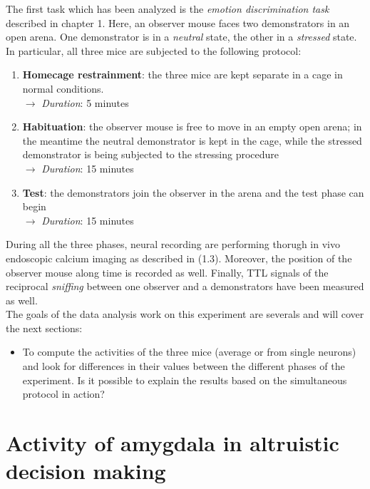 \documentclass[a4paper]{article}
\begin{document}
The first task which has been analyzed is the \textit{emotion discrimination task} described in chapter 1. Here, an observer mouse faces two demonstrators in an open arena. One demonstrator is in a \textit{neutral} state, the other in a \textit{stressed} state. In particular, all three mice are subjected to the following protocol:

\begin{enumerate}
	
	\item \textbf{Homecage restrainment}: the three mice are kept separate in a cage in normal conditions. \\
	$\longrightarrow$ \textit{Duration}: 5 minutes
	
	\item \textbf{Habituation}: the observer mouse is free to move in an empty open arena; in the meantime the neutral demonstrator is kept in the cage, while the stressed demonstrator is being subjected to the stressing procedure \\
	$\longrightarrow$  \textit{Duration}: 15 minutes
	
	\item \textbf{Test}: the demonstrators join the observer in the arena and the test phase can begin \\
	$\longrightarrow$  \textit{Duration}: 15 minutes
\end{enumerate}

During all the three phases, neural recording are performing thorugh in vivo endoscopic calcium imaging as described in (1.3). Moreover, the position of the observer mouse along time is recorded as well. Finally, TTL signals of the reciprocal \textit{sniffing} between one observer and a demonstrators have been measured as well.\\
The goals of the data analysis work on this experiment are severals and will cover the next sections:
\begin{itemize}
	\item To compute the activities of the three mice (average or from single neurons) and look for differences in their values between the different phases of the experiment. Is it possible to explain the results based on the simultaneous protocol in action?
	
\end{itemize}




\newpage
\section{Activity of amygdala in altruistic decision making}
\end{document}
